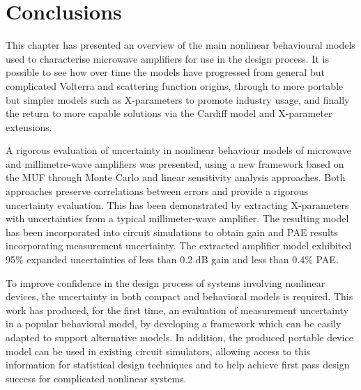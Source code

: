 \documentclass[../thesis/thesis.tex]{subfiles}
\begin{document}
\section{Conclusions}

This chapter has presented an overview of the main nonlinear behavioural models used to characterise microwave amplifiers for use in the design process. It is possible to see how over time the models have progressed from general but complicated Volterra and scattering function origins, through to more portable but simpler models such as X-parameters to promote industry usage, and finally the return to more capable solutions via the Cardiff model and X-parameter extensions.

A rigorous evaluation of uncertainty in nonlinear behaviour models of microwave and millimetre-wave amplifiers was presented, using a new framework based on the MUF through Monte Carlo and linear sensitivity analysis approaches. Both approaches preserve correlations between errors and provide a rigorous uncertainty evaluation. This has been demonstrated by extracting X-parameters with uncertainties from a typical millimeter-wave amplifier. The resulting model has been incorporated into circuit simulations to obtain gain and PAE results incorporating measurement uncertainty. The extracted amplifier model exhibited 95\% expanded uncertainties of less than 0.2 dB gain and less than 0.4\% PAE. 

To improve confidence in the design process of systems involving nonlinear devices, the uncertainty in both compact and behavioral models is required. This work has produced, for the first time, an evaluation of measurement uncertainty in a popular behavioral model, by developing a framework which can be easily adapted to support alternative models. In addition, the produced portable device model can be used in existing circuit simulators, allowing access to this information for statistical design techniques and to help achieve first pass design success for complicated nonlinear systems.

\end{document}
